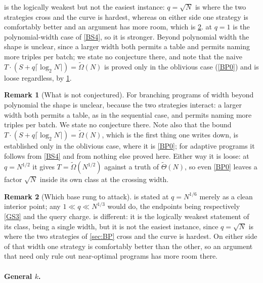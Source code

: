 \documentclass[11pt]{article}
\theoremstyle{plain}
\theoremstyle{definition}
\newtheorem{remark}{Remark}
\begin{document}
 is the logically weakest but not the easiest instance: $q=\sqrt
N$ is where the two strategies cross and the curve is hardest, whereas on
either side one strategy is comfortably better and an argument has more
room, which is \cref{r:parbase}.   at $q=1$ is the
polynomial-width case of \cref{BS4}, so it is stronger.  Beyond polynomial
width the shape is unclear, since a larger width both permits a table and
permits naming more triples per batch; we state no conjecture there, and
note that the naive $T\cdot(S+q\lceil\log_2N\rceil)=\tilde\Omega(N)$ is
proved only in the oblivious case (\cref{BP0}) and is loose regardless, by
\cref{r:notconj}.

\begin{remark}[What is not conjectured]\label{r:notconj}
For branching programs of width beyond polynomial the shape is unclear,
because the two strategies interact: a larger width both permits a table,
as in the sequential case, and permits naming more triples per batch.  We
state no conjecture there.  Note also that the bound
$T \cdot (S + q\lceil\log_2 N\rceil) = \tilde\Omega(N)$, which is the first
thing one writes down, is established only in the oblivious case, where it
is \cref{BP0}; for adaptive programs it follows from \cref{BS4} and from
nothing else proved here.  Either way it is loose: at $q = N^{1/2}$ it
gives $T = \tilde\Omega(N^{1/2})$ against a truth of $\tilde\Theta(N)$, so
even \cref{BP0} leaves a factor $\sqrt N$ inside its own class at the
crossing width.
\end{remark}

\begin{remark}[Which base rung to attack]\label{r:parbase}
 is stated at $q = N^{1/6}$ merely as a clean interior point; any
$1 \ll q \ll N^{1/3}$ would do, the endpoints being respectively
\cref{GS3} and the query charge.   is different: it is the
logically weakest statement of its class, being a single width, but it is
not the easiest instance, since $q = \sqrt N$ is where the two strategies
of \cref{sec:BP} cross and the curve is hardest.  On either side of that
width one strategy is comfortably better than the other, so an argument
that need only rule out near-optimal programs has more room there.
\end{remark}

\paragraph{General $k$.}
\end{document}
